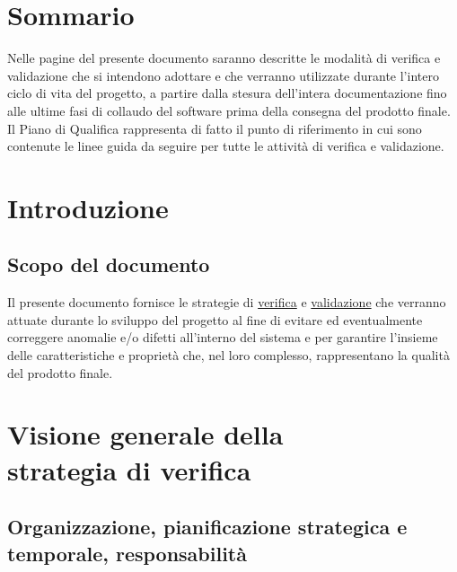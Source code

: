 \tableofcontents


\chapter*{Sommario}
Nelle pagine del presente documento saranno descritte le modalit\`a di verifica
e validazione che si intendono adottare e che verranno utilizzate durante
l'intero ciclo di vita del progetto, a partire dalla stesura dell'intera
documentazione fino alle ultime fasi di collaudo del software prima della
consegna del prodotto finale. Il Piano di Qualifica rappresenta di fatto il
punto di riferimento in cui sono contenute le linee guida da seguire per tutte
le attivit\`a di verifica e validazione.


\thispagestyle{fancy} %

\chapter{Introduzione}
\thispagestyle{fancy} %

\section{Scopo del documento}

Il presente documento fornisce le strategie di \underline{verifica} e
\underline{validazione} che verranno attuate durante lo sviluppo del progetto al
fine di evitare ed eventualmente correggere anomalie e/o difetti all'interno del
sistema e per garantire l'insieme delle caratteristiche e propriet\`a che, nel
loro complesso, rappresentano la qualit\`a del prodotto finale.




\chapter{Visione generale della \\strategia di verifica}
\thispagestyle{fancy} %

\section{Organizzazione, pianificazione strategica e \\temporale,
responsabilit\`a}

